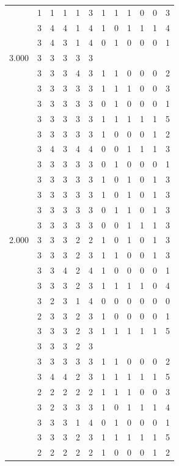 \documentclass[]{book}
\theoremstyle{definition}
\theoremstyle{definition}
\theoremstyle{definition}
\theoremstyle{remark}
\begin{document}
\begin{table}
{\begin{tabular}[t]{rrrrrrrrrrrr}
 & 1 & 1 & 1 & 1 & 3 & 1 & 1 & 1 & 0 & 0 & 3\\
 & 3 & 4 & 4 & 1 & 4 & 1 & 0 & 1 & 1 & 1 & 4\\
 & 3 & 4 & 3 & 1 & 4 & 0 & 1 & 0 & 0 & 0 & 1\\
3.000 & 3 & 3 & 3 & 3 & 3 &  &  &  &  &  & \\
 & 3 & 3 & 3 & 4 & 3 & 1 & 1 & 0 & 0 & 0 & 2\\
 & 3 & 3 & 3 & 3 & 3 & 1 & 1 & 1 & 0 & 0 & 3\\
 & 3 & 3 & 3 & 3 & 3 & 0 & 1 & 0 & 0 & 0 & 1\\
 & 3 & 3 & 3 & 3 & 3 & 1 & 1 & 1 & 1 & 1 & 5\\
 & 3 & 3 & 3 & 3 & 3 & 1 & 0 & 0 & 0 & 1 & 2\\
 & 3 & 4 & 3 & 4 & 4 & 0 & 0 & 1 & 1 & 1 & 3\\
 & 3 & 3 & 3 & 3 & 3 & 0 & 1 & 0 & 0 & 0 & 1\\
 & 3 & 3 & 3 & 3 & 3 & 1 & 0 & 1 & 0 & 1 & 3\\
 & 3 & 3 & 3 & 3 & 3 & 1 & 0 & 1 & 0 & 1 & 3\\
 & 3 & 3 & 3 & 3 & 3 & 0 & 1 & 1 & 0 & 1 & 3\\
 & 3 & 3 & 3 & 3 & 3 & 0 & 0 & 1 & 1 & 1 & 3\\
2.000 & 3 & 3 & 3 & 2 & 2 & 1 & 0 & 1 & 0 & 1 & 3\\
 & 3 & 3 & 3 & 2 & 3 & 1 & 1 & 0 & 0 & 1 & 3\\
 & 3 & 3 & 4 & 2 & 4 & 1 & 0 & 0 & 0 & 0 & 1\\
 & 3 & 3 & 3 & 2 & 3 & 1 & 1 & 1 & 1 & 0 & 4\\
 & 3 & 2 & 3 & 1 & 4 & 0 & 0 & 0 & 0 & 0 & 0\\
 & 2 & 3 & 3 & 2 & 3 & 1 & 0 & 0 & 0 & 0 & 1\\
 & 3 & 3 & 3 & 2 & 3 & 1 & 1 & 1 & 1 & 1 & 5\\
 & 3 & 3 & 3 & 2 & 3 &  &  &  &  &  & \\
 & 3 & 3 & 3 & 3 & 3 & 1 & 1 & 0 & 0 & 0 & 2\\
 & 3 & 4 & 4 & 2 & 3 & 1 & 1 & 1 & 1 & 1 & 5\\
 & 2 & 2 & 2 & 2 & 2 & 1 & 1 & 1 & 0 & 0 & 3\\
 & 3 & 2 & 3 & 3 & 3 & 1 & 0 & 1 & 1 & 1 & 4\\
 & 3 & 3 & 3 & 1 & 4 & 0 & 1 & 0 & 0 & 0 & 1\\
 & 3 & 3 & 3 & 2 & 3 & 1 & 1 & 1 & 1 & 1 & 5\\
 & 2 & 2 & 2 & 2 & 2 & 1 & 0 & 0 & 0 & 1 & 2\\

\end{tabular}}
\end{table}
\end{document}
